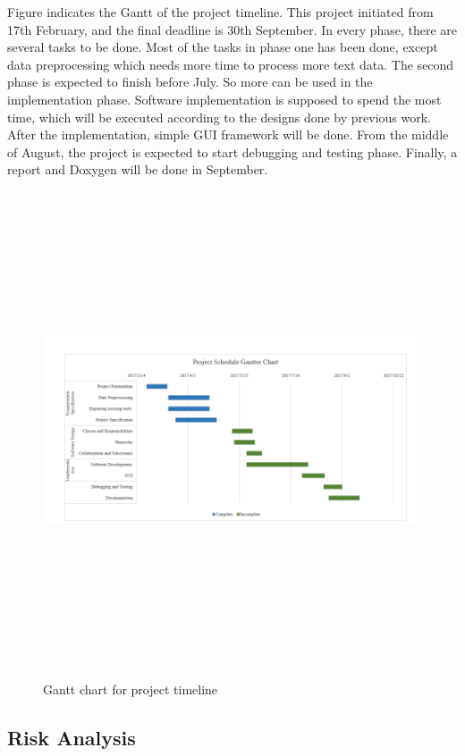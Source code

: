Figure \label{gantterChart} indicates the Gantt of the project timeline. This project initiated from 17th February, and the final deadline is 30th September. In every phase, there are several tasks to be done. Most of the tasks in phase one has been done, except data preprocessing which needs more time to process more text data. The second phase is expected to finish before July. So more can be used in the implementation phase. Software implementation is supposed to spend the most time, which will be executed according to the designs done by previous work. After the implementation, simple GUI framework will be done. From the middle of August, the project is expected to start debugging and testing phase. Finally, a report and Doxygen will be done in September. 

\begin{figure}[H]
	\centering	
	\includegraphics[width=16cm, height=14cm]{Figs/Gantter-Chart}\\[1ex]
	\caption{Gantt chart for project timeline }
	\label{fig:gantterChart}
\end{figure}


\subsection{Risk Analysis}

